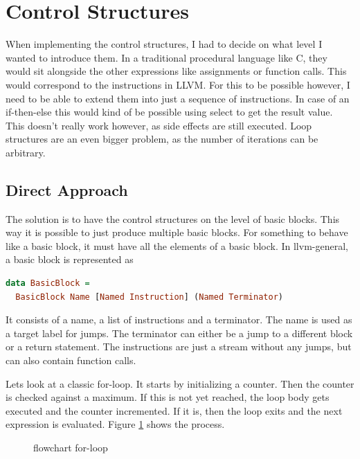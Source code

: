 \documentclass[a4paper,bibliography=totocnumbered,parskip,headsepline]{scrbook}
\begin{document}
\section{Control Structures}
When implementing the control structures, I had to decide on what level I wanted to introduce them.
In a traditional procedural language like C, they would sit alongside the other expressions like assignments or function calls.
This would correspond to the instructions in LLVM.
For this to be possible however, I need to be able to extend them into just a sequence of instructions.
In case of an if-then-else this would kind of be possible using select to get the result value.
This doesn't really work however, as side effects are still executed.
Loop structures are an even bigger problem, as the number of iterations can be arbitrary.

\subsection{Direct Approach}
The solution is to have the control structures on the level of basic blocks.
This way it is possible to just produce multiple basic blocks.
For something to behave like a basic block, it must have all the elements of a basic block.
In llvm-general, a basic block is represented as
\begin{lstlisting}[language=haskell]
data BasicBlock =
  BasicBlock Name [Named Instruction] (Named Terminator)
\end{lstlisting}

It consists of a name, a list of instructions and a terminator.
The name is used as a target label for jumps.
The terminator can either be a jump to a different block or a return statement.
The instructions are just a stream without any jumps, but can also contain function calls.

Lets look at a classic for-loop.
It starts by initializing a counter.
Then the counter is checked against a maximum.
If this is not yet reached, the loop body gets executed and the counter incremented.
If it is, then the loop exits and the next expression is evaluated.
Figure \ref{fig:forchart} shows the process.

\begin{figure}[h]
\begin{center}
\end{center}
\caption{flowchart for-loop}
\label{fig:forchart}
\end{figure}
\end{document}
